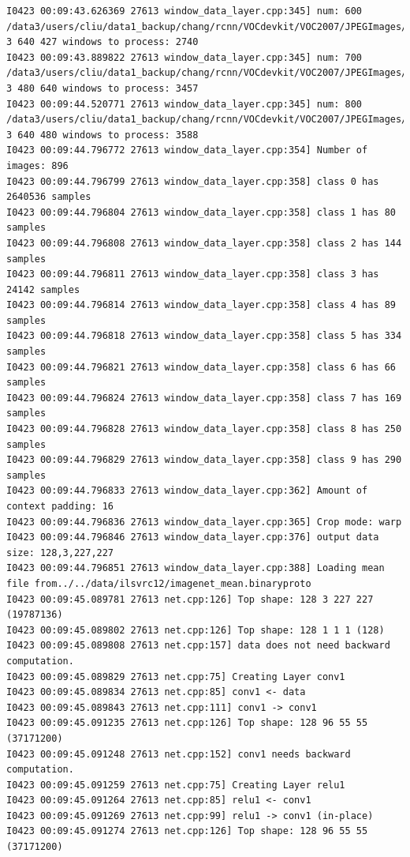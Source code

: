 \documentclass[a4]{article}
\begin{document}
\begin{lstlisting}
I0423 00:09:43.626369 27613 window_data_layer.cpp:345] num: 600 /data3/users/cliu/data1_backup/chang/rcnn/VOCdevkit/VOC2007/JPEGImages/COCO_val2014_000000408071.jpg 3 640 427 windows to process: 2740
I0423 00:09:43.889822 27613 window_data_layer.cpp:345] num: 700 /data3/users/cliu/data1_backup/chang/rcnn/VOCdevkit/VOC2007/JPEGImages/COCO_val2014_000000470121.jpg 3 480 640 windows to process: 3457
I0423 00:09:44.520771 27613 window_data_layer.cpp:345] num: 800 /data3/users/cliu/data1_backup/chang/rcnn/VOCdevkit/VOC2007/JPEGImages/COCO_val2014_000000550273.jpg 3 640 480 windows to process: 3588
I0423 00:09:44.796772 27613 window_data_layer.cpp:354] Number of images: 896
I0423 00:09:44.796799 27613 window_data_layer.cpp:358] class 0 has 2640536 samples
I0423 00:09:44.796804 27613 window_data_layer.cpp:358] class 1 has 80 samples
I0423 00:09:44.796808 27613 window_data_layer.cpp:358] class 2 has 144 samples
I0423 00:09:44.796811 27613 window_data_layer.cpp:358] class 3 has 24142 samples
I0423 00:09:44.796814 27613 window_data_layer.cpp:358] class 4 has 89 samples
I0423 00:09:44.796818 27613 window_data_layer.cpp:358] class 5 has 334 samples
I0423 00:09:44.796821 27613 window_data_layer.cpp:358] class 6 has 66 samples
I0423 00:09:44.796824 27613 window_data_layer.cpp:358] class 7 has 169 samples
I0423 00:09:44.796828 27613 window_data_layer.cpp:358] class 8 has 250 samples
I0423 00:09:44.796829 27613 window_data_layer.cpp:358] class 9 has 290 samples
I0423 00:09:44.796833 27613 window_data_layer.cpp:362] Amount of context padding: 16
I0423 00:09:44.796836 27613 window_data_layer.cpp:365] Crop mode: warp
I0423 00:09:44.796846 27613 window_data_layer.cpp:376] output data size: 128,3,227,227
I0423 00:09:44.796851 27613 window_data_layer.cpp:388] Loading mean file from../../data/ilsvrc12/imagenet_mean.binaryproto
I0423 00:09:45.089781 27613 net.cpp:126] Top shape: 128 3 227 227 (19787136)
I0423 00:09:45.089802 27613 net.cpp:126] Top shape: 128 1 1 1 (128)
I0423 00:09:45.089808 27613 net.cpp:157] data does not need backward computation.
I0423 00:09:45.089829 27613 net.cpp:75] Creating Layer conv1
I0423 00:09:45.089834 27613 net.cpp:85] conv1 <- data
I0423 00:09:45.089843 27613 net.cpp:111] conv1 -> conv1
I0423 00:09:45.091235 27613 net.cpp:126] Top shape: 128 96 55 55 (37171200)
I0423 00:09:45.091248 27613 net.cpp:152] conv1 needs backward computation.
I0423 00:09:45.091259 27613 net.cpp:75] Creating Layer relu1
I0423 00:09:45.091264 27613 net.cpp:85] relu1 <- conv1
I0423 00:09:45.091269 27613 net.cpp:99] relu1 -> conv1 (in-place)
I0423 00:09:45.091274 27613 net.cpp:126] Top shape: 128 96 55 55 (37171200)

\end{lstlisting}
\end{document}
